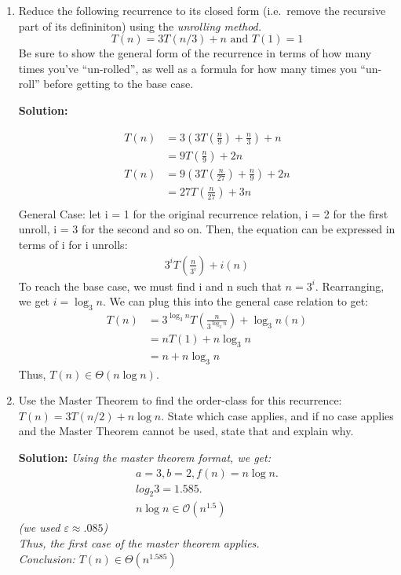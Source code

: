 \documentclass[10pt]{article}
\begin{document}
      \begin{enumerate}   
    
    	\item Reduce the following recurrence to its closed form (i.e.\ remove the recursive part of its defininiton) using the \emph{unrolling method.}
    	$$T(n) = 3 T(n/3) + n \textrm{ and } T(1) = 1$$
    	Be sure to show the general form of the recurrence in terms of how many times you've ``un-rolled'', as well as a formula for how many times you ``un-roll'' before getting to the base case.
    	
    	\textbf{Solution:}
    	
    	\begin{align*}
    	    T(n) &= 3\left( 3T\left(\frac{n}{9}\right) + \frac{n}{3} \right) + n \\
    	         &= 9T\left(\frac{n}{9}\right) + 2n \\
    	    T(n) &= 9\left(3T\left(\frac{n}{27}\right) + \frac{n}{9}\right)+ 2n \\
    	         &= 27T\left(\frac{n}{27}\right) + 3n \\
    	\end{align*}
    	General Case: let i = 1 for the original recurrence relation, i = 2 for the first unroll, i = 3 for the second and so on. Then, the equation can be expressed in terms of i for i unrolls: 
    	\begin{align*}
    	    3^{i}T\left(\frac{n}{3^{i}}\right) + i(n)
    	\end{align*}
    	To reach the base case, we must find i and n such that $n = 3^{i}$. Rearranging, we get $i = \log_3{n}$.
    	We can plug this into the general case relation to get:
    	\begin{align*}
    	    T(n) &= 3^{\log_3{n}}T\left(\frac{n}{3^{\log_3{n}}}\right) + \log_3{n}(n) \\
    	    &= nT(1) + n\log_3{n} \\
    	    &= n + n\log_3{n}
    	\end{align*}
    	Thus, $T(n) \in \Theta(n\log{n})$.
    
    	\item Use the Master Theorem to find the order-class for this recurrence: $T(n) = 3 T (n/2) + n \log n$.  State which case applies, and if no case applies and the Master Theorem cannot be used, state that and explain why.
    	
    	\textbf{Solution:}
    	\emph{
    	Using the master theorem format, we get:
    	\begin{align*}
    	    a = 3, b = 2, f(n) = n \log n. \\
    	    log_2{3} = 1.585. \\
    	    n\log{n} \in \mathcal{O}(n^{1.5})
    	\end{align*}
    	(we used $\varepsilon \approx .085$) \\
    	Thus, the first case of the master theorem applies. \\
    	Conclusion: $T(n) \in \Theta(n^{1.585})$
        }
        \pagebreak
        

\end{enumerate}
\end{document}
